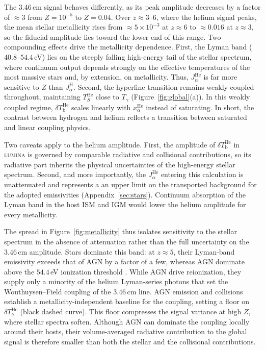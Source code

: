 \documentclass[apj,twocolumn, appendixfloats, twocolappendix, numberedappendix, tighten]{openjournal}
\DeclareRobustCommand{\lumina}{\mbox{\textsc{lumina}}\xspace}
\begin{document}
\begin{appendix}
The 3.46\,cm signal behaves differently, as its peak amplitude decreases by a factor of $\approx 3$ from $Z = 10^{-5}$ to $Z = 0.04$. Over $z \approx 3\text{--}6$, where the helium signal peaks, the mean stellar metallicity rises from $\approx 5\times10^{-3}$ at $z \approx 6$ to $\approx 0.016$ at $z \approx 3$, so the fiducial amplitude lies toward the lower end of this range. Two compounding effects drive the metallicity dependence. First, the  Lyman band ($40.8\text{--}54.4$\,eV) lies on the steeply falling high-energy tail of the stellar spectrum, where continuum output depends strongly on the effective temperatures of the most massive stars and, by extension, on metallicity. Thus, $J_\alpha^\mathrm{He}$ is far more sensitive to $Z$ than $J_\alpha^\mathrm{H}$. Second, the  hyperfine transition remains weakly coupled throughout, maintaining $T_S^\mathrm{He}$ close to $T_\gamma$ (Figure~\ref{fig:global}(a)). In this weakly coupled regime, $\delta T_\mathrm{b}^\mathrm{He}$ scales linearly with $x_\alpha^\mathrm{He}$ instead of saturating. In short, the contrast between hydrogen and helium reflects a transition between saturated and linear coupling physics.

Two caveats apply to the helium amplitude. First, the amplitude of $\delta T_\mathrm{b}^\mathrm{He}$ in \lumina is governed by comparable radiative and collisional contributions, so its radiative part inherits the physical uncertainties of the high-energy stellar spectrum. Second, and more importantly, the $J_\alpha^\mathrm{He}$ entering this calculation is unattenuated and represents a an upper limit on the transported background for the adopted emissivities (Appendix~\ref{sec:stars}). Continuum absorption of the  Lyman band in the host ISM and IGM would lower the helium amplitude for every metallicity.

The spread in Figure~\ref{fig:metallicity} thus isolates sensitivity to the stellar spectrum in the absence of attenuation rather than the full uncertainty on the 3.46\,cm amplitude. Stars dominate this band: at $z \approx 5$, their  Lyman-band emissivity exceeds that of AGN by a factor of a few, whereas AGN dominate above the $54.4$\,eV ionization threshold \citep[][their Fig.~19]{Zier2026}. While AGN drive  reionization, they supply only a minority of the helium Lyman-series photons that set the Wouthuysen--Field coupling of the 3.46\,cm line. AGN emission and collisions establish a metallicity-independent baseline for the coupling, setting a floor on $\delta T_b^\mathrm{He}$ (black dashed curve). This floor compresses the signal variance at high $Z$, where stellar spectra soften. Although AGN can dominate the coupling locally around their hosts, their volume-averaged radiative contribution to the global signal is therefore smaller than both the stellar and the collisional contributions.



\end{appendix}
\end{document}
